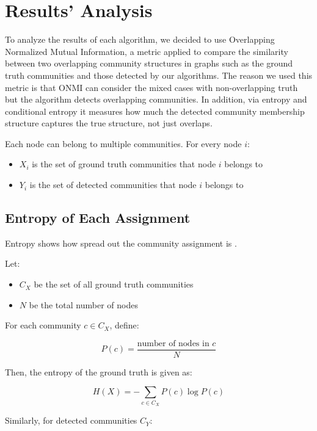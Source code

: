 \documentclass[conference]{IEEEtran}
\begin{document}
\section{Results' Analysis}
To analyze the results of each algorithm, we decided to use Overlapping Normalized Mutual Information, a metric applied to compare the similarity between two overlapping community structures in graphs such as the ground truth communities and those detected by our algorithms\cite{lancichinetti2009detecting}. The reason we used this metric is that ONMI can consider the mixed cases with non-overlapping truth but the algorithm detects overlapping communities. In addition, via entropy and conditional entropy it measures how much the detected community membership structure captures the true structure, not just overlaps. 







Each node can belong to multiple communities. For every node \( i \):
\begin{itemize}
    \item \( X_i \) is the set of ground truth communities that node \( i \) belongs to
    \item \( Y_i \) is the set of detected communities that node \( i \) belongs to
\end{itemize}

\subsection*{Entropy of Each Assignment}

Entropy shows how spread out the community assignment is \cite{cover2006}.



Let:
\begin{itemize}
    \item \( C_X \) be the set of all ground truth communities
    \item \( N \) be the total number of nodes
\end{itemize}

For each community \( c \in C_X \), define:

\[
P(c) = \frac{\text{number of nodes in } c}{N}
\]

Then, the entropy of the ground truth is given as:

\[
H(X) = -\sum_{c \in C_X} P(c) \log P(c)
\]

Similarly, for detected communities \( C_Y \):
\end{document}
